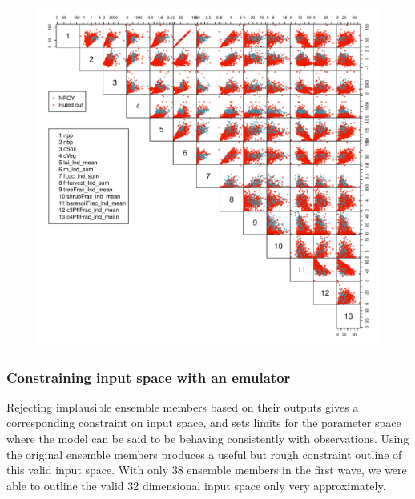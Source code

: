 \documentclass[gmd, manuscript]{copernicus}
\begin{document}
\begin{figure}[t]
\includegraphics[width=12cm]{./figs/fig07.pdf}
\caption{}
\label{fig:output_pairs}
\end{figure}


\subsubsection{Constraining input space with an emulator}\label{sssec:constraining_input_space_emulator}

Rejecting implausible ensemble members based on their outputs gives a corresponding constraint on input space, and sets limits for the parameter space where the model can be said to be behaving consistently with observations. Using the original ensemble members produces a useful but rough constraint outline of this valid input space. With only 38 ensemble members in the first wave, we were able to outline the valid 32 dimensional input space only very approximately.
\end{document}
